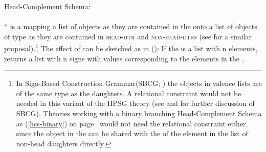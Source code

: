 \documentclass[output=paper,biblatex,babelshorthands,newtxmath,draftmode,colorlinks,citecolor=brown]{langscibook}
\begin{document}
\ea
Head-Complement Schema:\\
\label{schema-hc-flat}
 \impl\\*
\z
\largerpage
{} is a  mapping a list of  objects as they are contained in
the \compsl onto a list of objects of type  as they are contained in \textsc{head-dtr}
and \textsc{non-head-dtrs} (see \citealt[]{GSag2000a-u} for a similar proposal).\footnote{
  In Sign-Based Construction Grammar\indexsbcg (SBCG; \citealt{Sag2012a}) the objects in valence lists are of the same type as the
  daughters. A relational constraint would not be needed in this variant of the HPSG
  theory (see  and
   for further discussion of SBCG). Theories working with a binary branching Head-Complement Schema as (\ref{hcs-binary}) on
  page~\pageref{hcs-binary} would not need the relational constraint either, since the  object in
  the \compsl can be shared with the \synsemv of the element in the list of non-head daughters directly.
}
The effect of  can be sketched as in ():
\ea
\label{ex-schema-hc-flat-synsem-sign}
\z
If the \compsl is a list with n elements,  returns a list with n signs with
\synsem values corresponding to the elements in the \compsl.
\end{document}
